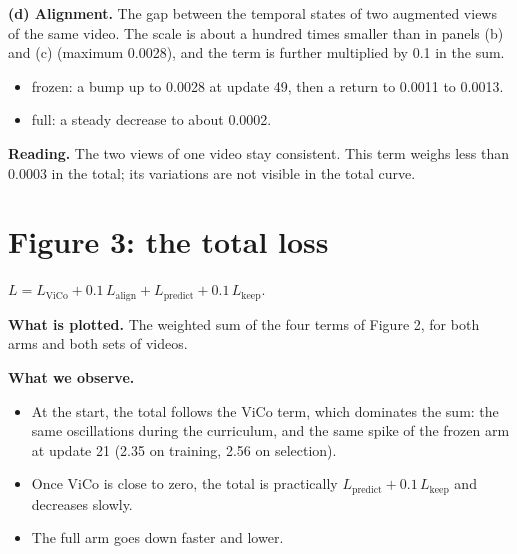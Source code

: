 \documentclass[11pt,a4paper]{article}
\newcommand{\reading}[1]{\textbf{Reading.} #1}
\newcommand{\four}[1]{%
  \addplot[frozen,thick] table[x=update,y=#1]{frozen_train.dat};
  \addplot[frozen,thick,densely dashed] table[x=update,y=#1]{frozen_selection.dat};
  \addplot[full,thick] table[x=update,y=#1]{full_train.dat};
  \addplot[full,thick,densely dashed] table[x=update,y=#1]{full_selection.dat};}
\begin{document}
\textbf{(d) Alignment.} The gap between the temporal states of two augmented views of the same
video. The scale is about a hundred times smaller than in panels (b) and (c) (maximum 0.0028),
and the term is further multiplied by 0.1 in the sum.
\begin{itemize}\itemsep1pt
\item \textcolor{frozen}{frozen}: a bump up to 0.0028 at update 49, then a return to 0.0011 to 0.0013.
\item \textcolor{full}{full}: a steady decrease to about 0.0002.
\end{itemize}
\reading{The two views of one video stay consistent. This term weighs less than 0.0003 in the
total; its variations are not visible in the total curve.}

\newpage
\section*{Figure 3: the total loss}

\begin{center}
\end{center}
{\footnotesize $L = L_{\text{ViCo}} + 0.1\,L_{\text{align}} + L_{\text{predict}} + 0.1\,L_{\text{keep}}$.}

\textbf{What is plotted.} The weighted sum of the four terms of Figure 2, for both arms and both
sets of videos.

\textbf{What we observe.}
\begin{itemize}\itemsep1pt
\item At the start, the total follows the ViCo term, which dominates the sum: the same
      oscillations during the curriculum, and the same spike of the frozen arm at update 21
      (2.35 on training, 2.56 on selection).
\item Once ViCo is close to zero, the total is practically
      $L_{\text{predict}} + 0.1\,L_{\text{keep}}$ and decreases slowly.
\item The full arm goes down faster and lower.
\end{itemize}
\end{document}
